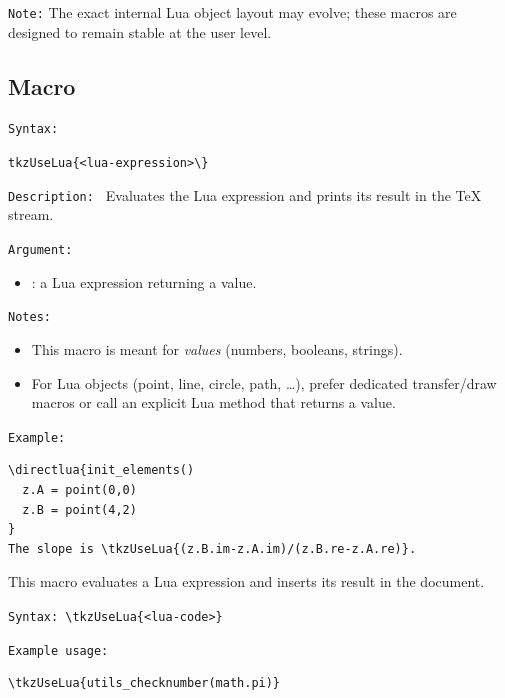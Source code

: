 \medskip
\texttt{Note:} The exact internal Lua object layout may evolve; these macros
are designed to remain stable at the user level.

\subsection{Macro }
\label{subsec:tkzUseLua}

\medskip
\texttt{Syntax: }

\verb|tkzUseLua{<lua-expression>\}|


\medskip
\texttt{Description: }
Evaluates the Lua expression and prints its result in the \TeX{} stream.

\medskip
\texttt{Argument: }
\begin{itemize}
\item {}: a Lua expression returning a value.
\end{itemize}

\medskip
\texttt{Notes: }
\begin{itemize}
\item This macro is meant for \emph{values} (numbers, booleans, strings).
\item For Lua objects (point, line, circle, path, \dots), prefer dedicated
transfer/draw macros or call an explicit Lua method that returns a value.
\end{itemize}

\texttt{Example: }
\begin{minipage}{.52\textwidth}
\begin{verbatim}
\directlua{init_elements()
  z.A = point(0,0)
  z.B = point(4,2)
}
The slope is \tkzUseLua{(z.B.im-z.A.im)/(z.B.re-z.A.re)}.
\end{verbatim}
\end{minipage}


This macro evaluates a Lua expression and inserts its result in the document.


\texttt{Syntax: }\verb|\tkzUseLua{<lua-code>}|

\texttt{Example usage: }

\begin{mybox}
\begin{verbatim}
\tkzUseLua{utils_checknumber(math.pi)}
\end{verbatim}
\end{mybox}


